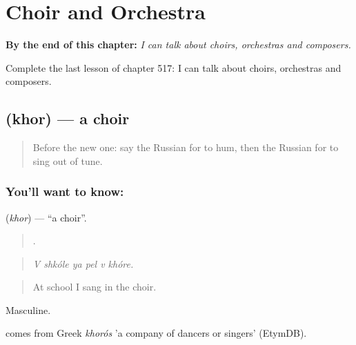 
\chapter{Choir and Orchestra}
\label{ch:ru-choir-and-orchestra}

\begin{chapteropening}
\textbf{By the end of this chapter:} \emph{I can talk about choirs, orchestras and composers.}

Complete the last lesson of chapter 517: I can talk about choirs, orchestras and composers.
\end{chapteropening}

\section[\texorpdfstring{\ru{хор} (khor)}{хор (khor)}]{ (khor) — a choir}

\label{lesson:RU-C517-khor}



\begin{quote}
Before the new one: say the Russian for to hum, then the Russian for to sing out of tune.
\end{quote}

\subsection*{You'll want to know: }
\textbf{} (\emph{khor}) — \textquotedblleft{}a choir\textquotedblright{}.

\begin{quote}
     .
\end{quote}

\begin{quote}
\emph{V shkóle ya pel v khóre.}
\end{quote}

\begin{quote}
At school I sang in the choir.
\end{quote}

Masculine.

\begin{cousinweb}
\emph{} comes from Greek \emph{khorós} 'a company of dancers or singers' (EtymDB).
\end{cousinweb}

